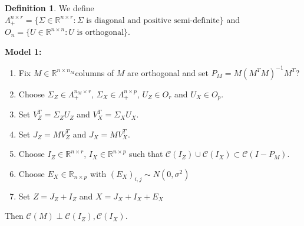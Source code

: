 \documentclass[notheorems]{beamer}
\theoremstyle{definition}
\newtheorem{defn}[definition]{Definition}
\newcommand{\Lam}{\Lambda}
\newcommand{\Sig}{\Sigma}
\newcommand{\sig}{\sigma}
\newcommand{\R}{\mathbb{R}}
\newcommand{\MC}{\mathcal{C}}
\begin{document}
\begin{frame}
\begin{defn}
We define $\Lam^{n \times r}_+ = \{\Sig \in \R^{n \times r}: \Sig \text{ is diagonal and positive semi-definite}\}$ and $O_n = \{U \in \R^{n \times n}: U \text{ is orthogonal}\}$. 
\end{defn}
\end{frame}































\begin{frame}
\textbf{Model 1:}
\begin{enumerate}
    \item Fix $M \in \R^{n \times n_M}$columns of $M$ are orthogonal and set $P_M = M(M^TM)^{-1}M^T $?
    \item Choose $\Sig_Z \in \Lam^{n_M \times r}_+$, $\Sig_X \in \Lam^{n \times p}_+$,  $U_Z \in O_{r}$ and $U_X \in O_p$. 
    \item Set $V_Z^T = \Sig_Z U_Z$ and $V_X^T = \Sig_X U_X$. 
    \item Set $J_Z = MV_Z^T$ and $J_X = MV_X^T$. 
    \item Choose $I_Z \in \R^{n \times r}$, $I_X \in \R^{n \times p}$ such that $\MC(I_Z) \cup \MC(I_X) \subset \MC(I -P_M)$. 
    \item Choose $E_X \in \R_{n \times p}$ with $(E_X)_{i,j} \sim N(0, \sig^2)$
    \item Set $Z = J_Z + I_Z$ and $X = J_X + I_X + E_X$ 
\end{enumerate}
Then $\MC(M) \perp \MC(I_Z), \MC(I_X)$.

\end{frame}
\end{document}

